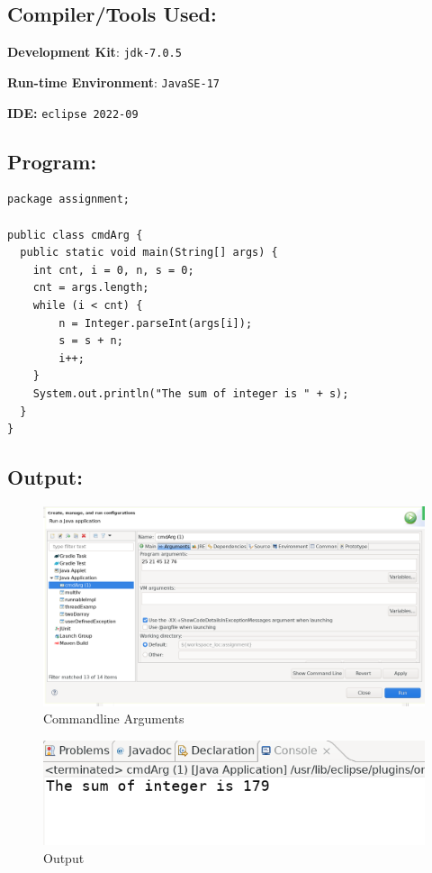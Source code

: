 \documentclass[12pt, a4paper]{article}
\begin{document}
\subsection*{Compiler/Tools Used:}
\textbf{Development Kit}: \verb+jdk-7.0.5+

\textbf{Run-time Environment}: \verb+JavaSE-17+

\textbf{IDE:} \verb+eclipse 2022-09+

\subsection*{Program:}
\begin{lstlisting}
package assignment;

public class cmdArg {
  public static void main(String[] args) {
    int cnt, i = 0, n, s = 0;
    cnt = args.length;
    while (i < cnt) {
        n = Integer.parseInt(args[i]);
        s = s + n;
        i++;
    }
    System.out.println("The sum of integer is " + s);
  }
}
\end{lstlisting}
\newpage

\subsection*{Output:}
\begin{figure}[h]
  \centering
  \includegraphics[width=\textwidth]{cmdarg1}
  \caption{Commandline Arguments}
\end{figure}
\begin{figure}[h]
  \centering
  \includegraphics[width=\textwidth]{cmdarg2}
  \caption{Output}
\end{figure}
\newpage
\end{document}
